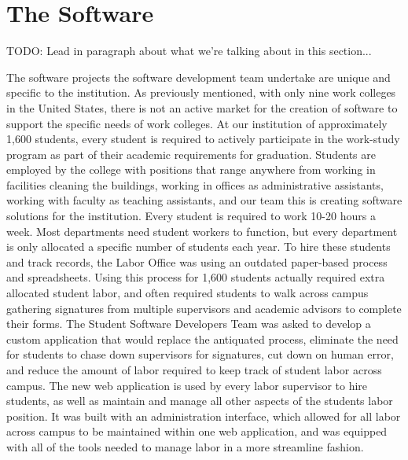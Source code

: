 \section{The Software}

TODO: Lead in paragraph about what we're talking about in this section...

The software projects the software development team undertake are unique and specific to the institution. As previously mentioned, with only nine work colleges in the United States, there is not an active market for the creation of software to support the specific needs of work colleges. At our institution of approximately 1,600 students, every student is required to actively participate in the work-study program as part of their academic requirements for graduation. Students are employed by the college with positions that range anywhere from working in facilities cleaning the buildings, working in offices as administrative assistants, working with faculty as teaching assistants, and our team this is creating software solutions for the institution. Every student is required to work 10-20 hours a week. Most departments need student workers to function, but every department is only allocated a specific number of students each year. To hire these students and track records, the Labor Office was using an outdated paper-based process and spreadsheets. Using this process for 1,600 students actually required extra allocated student labor, and often required students to walk across campus gathering signatures from multiple supervisors and academic advisors to complete their forms. The Student Software Developers Team was asked to develop a custom application that would replace the antiquated process, eliminate the need for students to chase down supervisors for signatures, cut down on human error, and reduce the amount of labor required to keep track of student labor across campus. The new web application is used by every labor supervisor to hire students, as well as maintain and manage all other aspects of the students labor position. It was built with an administration interface, which allowed for all labor across campus to be maintained within one web application, and was equipped with all of the tools needed to manage labor in a more streamline fashion.

